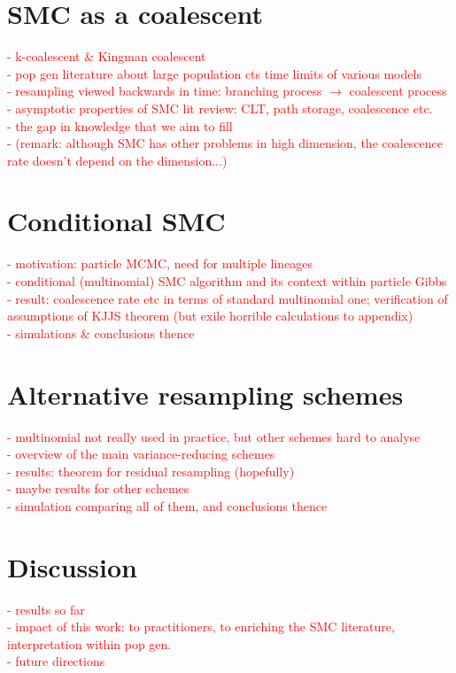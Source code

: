 \documentclass[fleqn]{article}
\begin{document}
\section{SMC as a coalescent}
\textcolor{red}{
- k-coalescent \& Kingman coalescent\\
- pop gen literature about large population cts time limits of various models\\
- resampling viewed backwards in time: branching process $\to$ coalescent process\\
- asymptotic properties of SMC lit review: CLT, path storage, coalescence etc.\\
- the gap in knowledge that we aim to fill\\
- (remark: although SMC has other problems in high dimension, the coalescence rate doesn't depend on the dimension...)
}

\section{Conditional SMC}
\textcolor{red}{
- motivation: particle MCMC, need for multiple lineages\\
- conditional (multinomial) SMC algorithm and its context within particle Gibbs\\
- result: coalescence rate etc in terms of standard multinomial one; verification of assumptions of KJJS theorem (but exile horrible calculations to appendix)\\
- simulations \& conclusions thence
}

\section{Alternative resampling schemes}
\textcolor{red}{
- multinomial not really used in practice, but other schemes hard to analyse\\
- overview of the main variance-reducing schemes\\
- results: theorem for residual resampling (hopefully)\\
- maybe results for other schemes\\
- simulation comparing all of them, and conclusions thence
}

\section{Discussion}
\textcolor{red}{
- results so far\\
- impact of this work: to practitioners, to enriching the SMC literature, interpretation within pop gen.\\
- future directions
}



\end{document}
